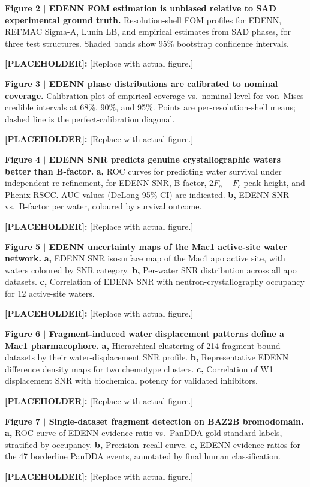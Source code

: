 \documentclass[10pt,twocolumn]{article}
\newcommand{\placeholder}[1]{%
  \begin{mdframed}[
    linecolor=placeholder,linewidth=1pt,
    backgroundcolor=red!5,
    innertopmargin=6pt,innerbottommargin=6pt,
    innerleftmargin=8pt,innerrightmargin=8pt]
  \small\color{placeholder}\textbf{[PLACEHOLDER]:} #1
  \end{mdframed}
}
\begin{document}
\noindent\textbf{Figure 2 $|$ EDENN FOM estimation is unbiased
relative to SAD experimental ground truth.}
Resolution-shell FOM profiles for EDENN, REFMAC Sigma-A, Lunin LB,
and empirical estimates from SAD phases, for three test structures.
Shaded bands show 95\% bootstrap confidence intervals.
\placeholder{[Replace with actual figure.]}

\noindent\textbf{Figure 3 $|$ EDENN phase distributions are
calibrated to nominal coverage.}
Calibration plot of empirical coverage vs.\ nominal level for
von~Mises credible intervals at 68\%, 90\%, and 95\%.
Points are per-resolution-shell means; dashed line is the
perfect-calibration diagonal.
\placeholder{[Replace with actual figure.]}

\noindent\textbf{Figure 4 $|$ EDENN SNR predicts genuine
crystallographic waters better than B-factor.}
\textbf{a,} ROC curves for predicting water survival under
independent re-refinement, for EDENN SNR, B-factor, 2$F_o-F_c$
peak height, and Phenix RSCC.
AUC values (DeLong 95\% CI) are indicated.
\textbf{b,} EDENN SNR vs.\ B-factor per water, coloured by
survival outcome.
\placeholder{[Replace with actual figure.]}

\noindent\textbf{Figure 5 $|$ EDENN uncertainty maps of the
Mac1 active-site water network.}
\textbf{a,} EDENN SNR isosurface map of the Mac1 apo active site,
with waters coloured by SNR category.
\textbf{b,} Per-water SNR distribution across all apo datasets.
\textbf{c,} Correlation of EDENN SNR with neutron-crystallography
occupancy for 12 active-site waters.
\placeholder{[Replace with actual figure.]}

\noindent\textbf{Figure 6 $|$ Fragment-induced water displacement
patterns define a Mac1 pharmacophore.}
\textbf{a,} Hierarchical clustering of 214 fragment-bound datasets
by their water-displacement SNR profile.
\textbf{b,} Representative EDENN difference density maps for
two chemotype clusters.
\textbf{c,} Correlation of W1 displacement SNR with biochemical
potency for validated inhibitors.
\placeholder{[Replace with actual figure.]}

\noindent\textbf{Figure 7 $|$ Single-dataset fragment detection
on BAZ2B bromodomain.}
\textbf{a,} ROC curve of EDENN evidence ratio vs.\ PanDDA
gold-standard labels, stratified by occupancy.
\textbf{b,} Precision--recall curve.
\textbf{c,} EDENN evidence ratios for the 47 borderline
PanDDA events, annotated by final human classification.
\placeholder{[Replace with actual figure.]}

\end{document}
